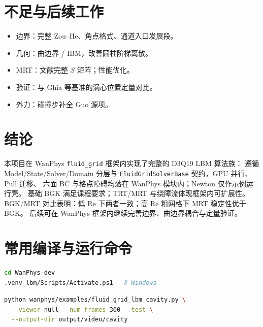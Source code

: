 \documentclass[UTF8,a4paper,11pt]{ctexart}
\begin{document}
\section{不足与后续工作}

\begin{itemize}
  \item 边界：完整 Zou--He、角点格式、通道入口发展段。
  \item 几何：曲边界 / IBM，改善圆柱阶梯离散。
  \item MRT：文献完整 $S$ 矩阵；性能优化。
  \item 验证：与 Ghia 等基准的涡心位置定量对比。
  \item 外力：碰撞步补全 Guo 源项。
\end{itemize}

\section{结论}

本项目在 WanPhys \texttt{fluid\_grid} 框架内实现了完整的 D3Q19 LBM 算法族：
遵循 Model/State/Solver/Domain 分层与 \texttt{FluidGridSolverBase} 契约，GPU 并行、Pull 迁移、
六面 BC 与格点障碍均落在 WanPhys 模块内；Newton 仅作示例运行壳。
基础 BGK 满足课程要求；TRT/MRT 与绕障流体现框架内可扩展性。
BGK/MRT 对比表明：低 Re 下两者一致；高 Re 粗网格下 MRT 稳定性优于 BGK。
后续可在 WanPhys 框架内继续完善边界、曲边界耦合与定量验证。

\appendix
\section{常用编译与运行命令}

\begin{lstlisting}[language=bash,caption={环境}]
cd WanPhys-dev
.venv_lbm/Scripts/Activate.ps1   # Windows
\end{lstlisting}

\begin{lstlisting}[language=bash,caption={顶盖方腔}]
python wanphys/examples/fluid_grid_lbm_cavity.py \
  --viewer null --num-frames 300 --test \
  --output-dir output/video/cavity
\end{lstlisting}
\end{document}
